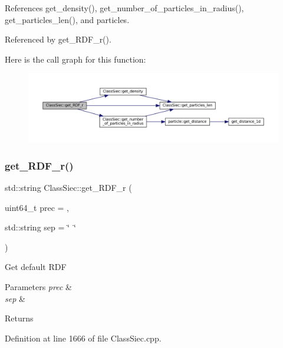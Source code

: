References get\+\_\+density(), get\+\_\+number\+\_\+of\+\_\+particles\+\_\+in\+\_\+radius(), get\+\_\+particles\+\_\+len(), and particles.



Referenced by get\+\_\+\+R\+D\+F\+\_\+r().

Here is the call graph for this function\+:
\nopagebreak
\begin{figure}[H]
\begin{center}
\leavevmode
\includegraphics[width=350pt]{classClassSiec_a609cc786246741388e18ed50c0165388_cgraph}
\end{center}
\end{figure}
\mbox{\label{classClassSiec_aad7c55f1dfa1b5bca25fc39e0b509304}} 
\subsubsection{\texorpdfstring{get\+\_\+\+R\+D\+F\+\_\+r()}{get\_RDF\_r()}\hspace{0.1cm}{\footnotesize\ttfamily [2/2]}}
{\footnotesize\ttfamily std\+::string Class\+Siec\+::get\+\_\+\+R\+D\+F\+\_\+r (\begin{DoxyParamCaption}\item[{uint64\+\_\+t}]{prec = {},  }\item[{std\+::string}]{sep = {\ttfamily \char`\"{}~\char`\"{}} }\end{DoxyParamCaption})}

Get default R\+DF 
\begin{DoxyParams}{Parameters}
{\em prec} & \\
\hline
{\em sep} & \\
\hline
\end{DoxyParams}
\begin{DoxyReturn}{Returns}

\end{DoxyReturn}


Definition at line 1666 of file Class\+Siec.\+cpp.



